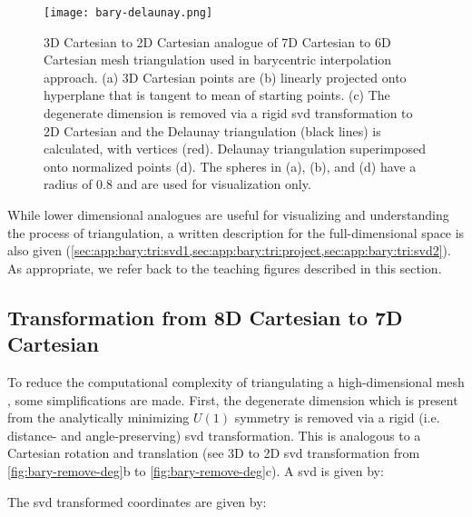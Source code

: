 \documentclass[final,12pt]{elsarticle}
\begin{document}
\begin{figure}
	\centering
	\texttt{[image: bary-delaunay.png]}
	\caption{3D Cartesian to 2D Cartesian analogue of 7D Cartesian to 6D Cartesian mesh triangulation used in barycentric interpolation approach. (a) 3D Cartesian \inpt{} points are (b) linearly projected onto hyperplane that is tangent to mean of starting points. (c) The degenerate dimension is removed via a rigid \gls{svd} transformation to 2D Cartesian and the Delaunay triangulation (black lines) is calculated, with \inpt{} vertices (red). Delaunay triangulation superimposed onto normalized \inpt{} points (d). The spheres in (a), (b), and (d) have a radius of 0.8 and are used for visualization only.}
	\label{fig:bary-delaunay}
\end{figure}

While lower dimensional analogues are useful for visualizing and understanding the process of triangulation, a written description for the full-dimensional space is also given (\cref{sec:app:bary:tri:svd1,sec:app:bary:tri:project,sec:app:bary:tri:svd2}). As appropriate, we refer back to the teaching figures described in this section.

\subsection{ Transformation from 8D Cartesian to 7D Cartesian}
\label{sec:app:bary:tri:svd1}
To reduce the computational complexity of triangulating a high-dimensional mesh \cite{barberQuickhullAlgorithmConvex1996}, some simplifications are made. First, the degenerate dimension which is present from the analytically minimizing $U(1)$ symmetry \cite{francisGeodesicOctonionMetric2019} is removed via a rigid (i.e. distance- and angle-preserving) \gls{svd} transformation.
This is analogous to a Cartesian rotation and translation (see 3D to 2D \gls{svd} transformation from \cref{fig:bary-remove-deg}b to \cref{fig:bary-remove-deg}c).
A \gls{svd} is given by:

The \gls{svd} transformed coordinates \cite{anatoliyCheckIfRay2015} are given by:

%
\end{document}
